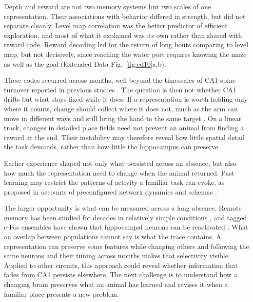 \documentclass[fleqn,10pt]{wlscirep}
\begin{document}
Depth and reward are not two memory systems but two scales of one representation. Their associations with behavior differed in strength, but did not separate cleanly. Level map correlation was the better predictor of efficient exploration, and most of what it explained was its own rather than shared with reward code. Reward decoding led for the return of long bouts comparing to level map, but not decisively, since reaching the water port requires knowing the maze as well as the goal (Extended Data Fig.~\ref{fig:ed10}a,b). 

These codes recurred across months, well beyond the timescales of CA1 spine turnover reported in previous studies \cite{attardo_impermanence_2015, pfeiffer_chronic_2018}. The question is then not whether CA1 drifts but what stays fixed while it does. If a representation is worth holding only where it counts, change should collect where it does not, much as the arm can move in different ways and still bring the hand to the same target  \cite{scholz_identifying_2000}. On a linear track, changes in detailed place fields need not prevent an animal from finding a reward at the end. Their instability may therefore reveal how little spatial detail the task demands, rather than how little the hippocampus can preserve \cite{kentros_increased_2004, chen_singlefield_2026}.

Earlier experience shaped not only what persisted across an absence, but also how much the representation need to change when the animal returned. Past learning may restrict the patterns of activity a familiar task can evoke, as proposed in accounts of preconfigured network dynamics \cite{mckenzie_preexisting_2021, buzsaki_neurophysiology_2022} and schemas \cite{tse_schemas_2007}.

The larger opportunity is what can be measured across a long absence. Remote memory has been studied for decades in relatively simple conditions \cite{frankland_organization_2005,squire_memory_2015}, and tagged c-Fos ensembles have shown that hippocampal neurons can be reactivated \cite{tayler_reactivation_2013, tanaka_hippocampal_2018, refaeli_engram_2023, ko_systems_2025}. What an overlap between populations cannot say is what the trace contains. A representation can preserve some features while changing others and following the same neurons and their tuning across months makes that selectivity visible. Applied to other circuits, this approach could reveal whether information that fades from CA1 persists elsewhere. The next challenge is to understand how a changing brain preserves what an animal has learned and revises it when a familiar place presents a new problem.
\end{document}

